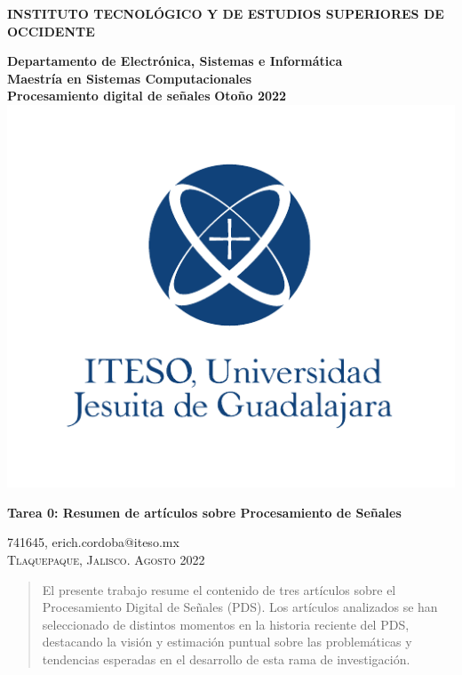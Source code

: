 \documentclass[11pt, twocolumn]{article}
\begin{document}
\begin{titlepage}
	\centering
	\LARGE
	\textbf{INSTITUTO TECNOLÓGICO Y DE ESTUDIOS SUPERIORES DE OCCIDENTE}
	
	\large
	\textbf{Departamento de Electrónica, Sistemas e Informática}\\
	\textbf{Maestría en Sistemas Computacionales}\\
	\vspace{1.0cm}
	\textbf{Procesamiento digital de señales}
	\textbf{Otoño 2022}
	\includegraphics[scale=1.2]{images/iteso_logo}

	\LARGE
	\textbf{Tarea 0: Resumen de artículos sobre Procesamiento de Señales}
	\vfill
	
	\textsf{741645, erich.cordoba@iteso.mx}\\
	\textsc{Tlaquepaque, Jalisco. Agosto 2022}
\end{titlepage}


\begin{abstract}
El presente trabajo resume el contenido de tres artículos sobre el Procesamiento Digital de Señales (PDS). Los artículos analizados se han seleccionado de distintos momentos en la historia reciente del PDS, destacando la visión y estimación puntual sobre las problemáticas y tendencias esperadas en el desarrollo de esta rama de investigación.
\end{abstract}
\end{document}
